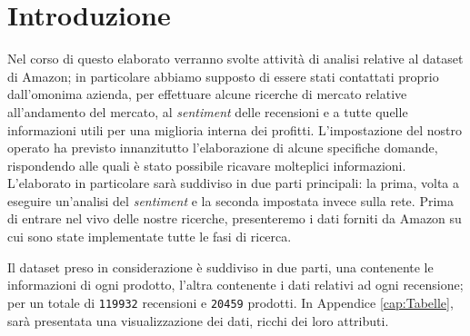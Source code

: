 \chapter*{Introduzione}
	Nel corso di questo elaborato verranno svolte attività di analisi relative al dataset di Amazon; in particolare abbiamo supposto di essere stati contattati proprio dall'omonima azienda, per effettuare alcune ricerche di mercato relative all'andamento del mercato, al \textit{sentiment} delle recensioni e a tutte quelle informazioni utili per una miglioria interna dei profitti. L'impostazione del nostro operato ha previsto innanzitutto l'elaborazione di alcune specifiche domande, rispondendo alle quali è stato possibile ricavare molteplici informazioni. L'elaborato in particolare sarà suddiviso in due parti principali: la prima, volta a eseguire un'analisi del \textit{sentiment} e la seconda impostata invece sulla rete. Prima di entrare nel vivo delle nostre ricerche, presenteremo i dati forniti da Amazon su cui sono state implementate tutte le fasi di ricerca.

	Il dataset preso in considerazione è suddiviso in due parti, una contenente le informazioni di ogni prodotto, l’altra contenente i dati relativi ad ogni recensione; per un totale di \verb|119932| recensioni e \verb|20459| prodotti. In Appendice \ref{cap:Tabelle}, sarà presentata una visualizzazione dei dati, ricchi dei loro attributi.
	
